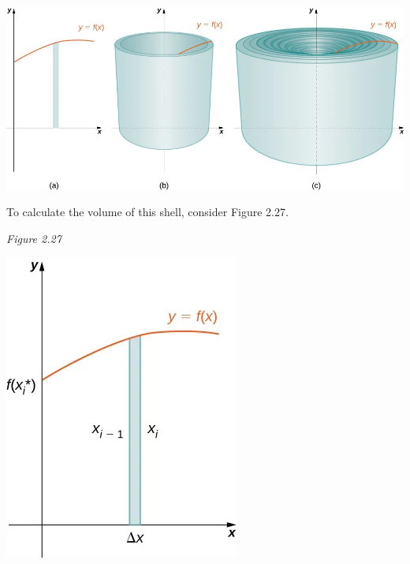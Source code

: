 \documentclass{report}
\begin{document}
    \begin{minipage}[]{0.47\textwidth}
    \begin{center}
        \includegraphics[scale=0.27]{./figures/graph27.png}
    \end{center} 
    \end{minipage}
    \bigbreak \noindent 
    \begin{minipage}[]{0.47\textwidth}
        To calculate the volume of this shell, consider Figure 2.27.
    \end{minipage}
    \begin{minipage}[]{0.47\textwidth}
        \textit{Figure 2.27}
        \begin{center}
            \includegraphics[scale=0.5]{ ./figures/graph28.png }
        \end{center}
    \end{minipage}
\end{document}
